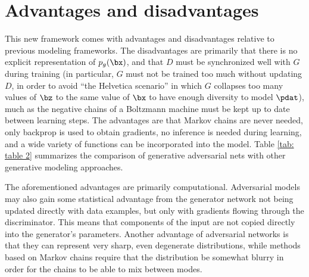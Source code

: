 \section{Advantages and disadvantages}

This new framework comes with advantages and disadvantages relative to previous modeling frameworks. The disadvantages are primarily that there is no explicit representation of $p_g(\bx)$, and that $D$ must be synchronized well with $G$ during training (in particular, $G$ must not be trained too much without updating $D$, in order to avoid ``the Helvetica scenario''
in which $G$ collapses too many values of $\bz$ to the same value of $\bx$ to have enough diversity to model $\pdat$), much as the negative chains of a Boltzmann machine must be kept up to date between learning steps. The advantages are that Markov chains are never needed, only backprop is used to obtain gradients, no inference is needed during learning, and a wide variety of functions can be incorporated into the model. Table \ref{tab: table 2}
summarizes the comparison of generative adversarial nets with other generative modeling approaches.

The aforementioned advantages are primarily computational. Adversarial models may also gain some statistical advantage from the generator network not being updated directly with data examples, but only with gradients flowing through the discriminator. This means that components of the input are not copied directly into the generator’s parameters. Another advantage of adversarial networks is that they can represent very sharp, even degenerate distributions, while methods based on Markov chains require that the distribution be somewhat blurry in order for the chains to be able to mix between modes.
